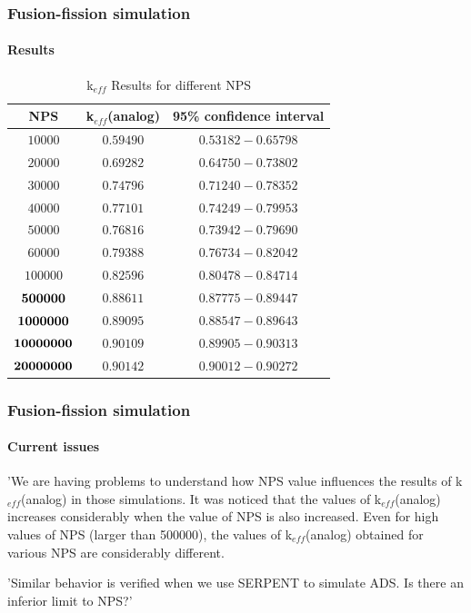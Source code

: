 \documentclass[svgnames,smaller,table]{beamer}
\begin{document}
\begin{frame}
  \frametitle{Fusion-fission simulation}
  \framesubtitle{Results}
  

\begin{table}[htb!]
\caption{k$_{eff}$ Results for different NPS}
\label{NPS}
\centering
\vspace{0.5cm}
\begin{tabular}{c|c|c}\hline
NPS & k$_{eff}$(analog) & 95\% confidence interval\\ \hline
$10000$ & $0.59490$ & $0.53182-0.65798$\\ \hline
$20000$ & $0.69282$ & $0.64750-0.73802$\\ \hline
$30000$ & $0.74796$ & $0.71240-0.78352$\\ \hline
$40000$ & $0.77101$ & $0.74249-0.79953$\\ \hline
$50000$ & $0.76816$ & $0.73942-0.79690$\\ \hline
$60000$ & $0.79388$ & $0.76734-0.82042$\\ \hline
$100000$ & $0.82596$ & $0.80478-0.84714$\\ \hline
${\bf 500000}$ & $0.88611$ & $0.87775-0.89447$\\ \hline
${\bf 1000000}$ & $0.89095$ & $0.88547-0.89643$\\ \hline
${\bf 10000000}$ & $0.90109$ & $0.89905-0.90313$\\ \hline
${\bf 20000000}$ & $0.90142$ & $0.90012-0.90272$\\ \hline
\end{tabular}
\end{table}
\end{frame}

\begin{frame}
  \frametitle{Fusion-fission simulation}
  \framesubtitle{Current issues}

  'We are having problems to understand how NPS value influences the results of k$_{eff}$(analog) in those simulations. It was noticed that the values of k$_{eff}$(analog) increases considerably when the value of NPS is also increased. Even for high values of NPS (larger than 500000), the values of  k$_{eff}$(analog) obtained for various NPS are considerably different. %
  \vspace{10px}

'Similar behavior is verified when we use SERPENT to simulate ADS. Is there an inferior limit to NPS?'
\end{frame}
\end{document}

